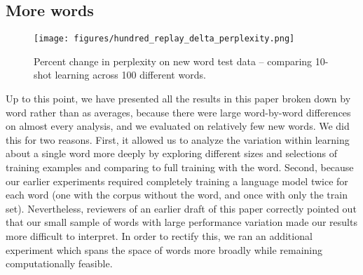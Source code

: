 \documentclass{article}
\begin{document}
\subsection{More words}
\begin{figure}
\texttt{[image: figures/hundred\_replay\_delta\_perplexity.png]}
\caption{Percent change in perplexity on new word test data -- comparing 10-shot learning across 100 different words.}
\label{hundred_word_figure}
\end{figure}
Up to this point, we have presented all the results in this paper broken down by word rather than as averages, because there were large word-by-word differences on almost every analysis, and we evaluated on relatively few new words. %
We did this for two reasons. First, it allowed us to analyze the variation within learning about a single word more deeply by exploring different sizes and selections of training examples and comparing to full training with the word. Second, because our earlier experiments required completely training a language model twice for each word (one with the corpus without the word, and once with only the train set). Nevertheless, reviewers of an earlier draft of this paper correctly pointed out that our small sample of words with large performance variation made our results more difficult to interpret. In order to rectify this, we ran an additional experiment which spans the space of words more broadly while remaining computationally feasible. \par
\end{document}
